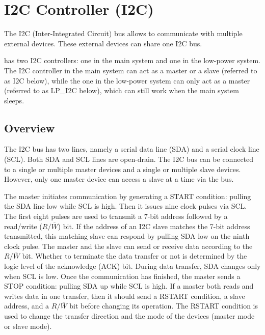 \documentclass[main\_\_EN.tex]{subfiles}
\begin{document}

\ifglobal
\else
    \listoftodos
    {\let\clearpage\relax \listofdonetodos}
    \tableofcontents
\fi










\hypertarget{i2c}{}
\chapter{I2C Controller (I2C)}
\label{mod:i2c}

The I2C (Inter-Integrated Circuit) bus allows \chipname{} to communicate with multiple external devices. These external devices can share one I2C bus.

\chipname{} has two I2C controllers: one in the main system and one in the low-power system. The I2C controller in the main system can act as a master or a slave (referred to as I2C below), while the one in the low-power system can only act as a master (referred to as LP\_I2C below), which can still work when the main system sleeps.

\section{Overview}

The I2C bus has two lines, namely a serial data line (SDA) and a serial clock line (SCL). Both SDA and SCL lines are open-drain. The I2C bus can be connected to a single or multiple master devices and a single or multiple slave devices. However, only one master device can access a slave at a time via the bus.

The master initiates communication by generating a START condition: pulling the SDA line low while SCL is high. Then it issues nine clock pulses via SCL. The first eight pulses are used to transmit a 7-bit address followed by a read/write ($R/\overline W$) bit. If the address of an I2C slave matches the 7-bit address transmitted, this matching slave can respond by pulling SDA low on the ninth clock pulse. The master and the slave can send or receive data according to the $R/\overline W$ bit. Whether to terminate the data transfer or not is determined by the logic level of the acknowledge (ACK) bit. During data transfer, SDA changes only when SCL is low. Once the communication has finished, the master sends a STOP condition: pulling SDA up while SCL is high. If a master both reads and writes data in one transfer, then it should send a RSTART condition, a slave address, and a $R/\overline W$ bit before changing its operation. The RSTART condition is used to change the transfer direction and the mode of the devices (master mode or slave mode).
\end{document}
